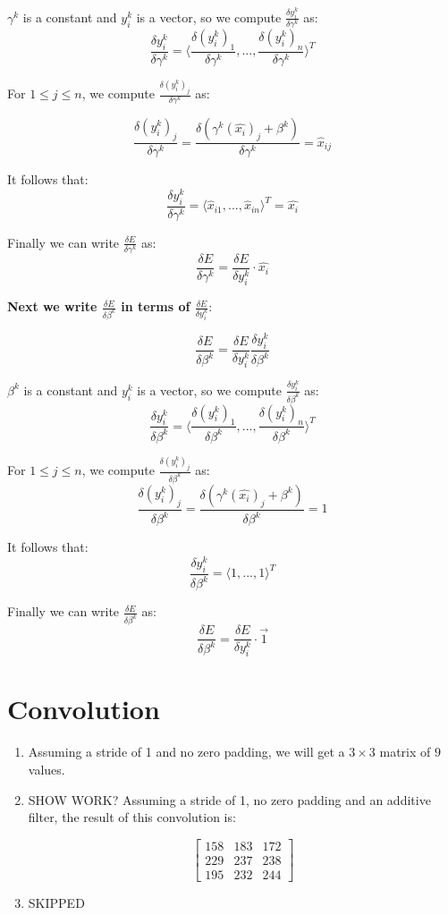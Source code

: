 \documentclass[a4paper]{article}
\begin{document}
\begin{enumerate}
{$\gamma^k$ is a constant and $y_i^k$ is a vector, so we compute $\frac{\delta y_i^k}{\delta \gamma^k}$ as:
$$ \frac{\delta y_i^k}{\delta \gamma^k} = \Big \langle \frac{\delta (y_i^k)_1}{\delta \gamma^k},...,\frac{\delta (y_i^k)_n}{\delta \gamma^k} \Big \rangle^T$$

For $1 \leq j \leq n$, we compute $\frac{\delta (y_i^k)_j}{\delta \gamma^k}$ as: 

$$\frac{\delta (y_i^k)_j}{\delta \gamma^k} =  \frac{\delta ( \gamma^k (\hat{x_i})_j + \beta^k  )} {\delta \gamma^k} = \hat{x}_{ij}$$

It follows that:
$$ \frac{\delta y_i^k}{\delta \gamma^k} = \langle \hat{x}_{i1},...,\hat{x}_{in} \rangle^T = \hat{x_i} $$

Finally we can write $\frac{\delta E}{\delta \gamma^k}$ as:
$$ \frac{\delta E}{\delta \gamma^k} = \frac{\delta E}{\delta y_i^k} \cdot  \hat{x_i}$$

\textbf{Next we write $\frac{\delta E}{\delta \beta^k}$ in terms of $\frac{\delta E}{\delta y_i^k}$}:

$$\frac{\delta E}{\delta \beta^k} = \frac{\delta E}{\delta y_i^k} \frac{\delta y_i^k}{\delta \beta^k}$$

$\beta^k$ is a constant and $y_i^k$ is a vector, so we compute $\frac{\delta y_i^k}{\delta \beta^k}$ as:
$$\frac{\delta y_i^k}{\delta \beta^k} = \Big \langle \frac{\delta (y_i^k)_1}{\delta \beta^k},...,\frac{\delta (y_i^k)_n}{\delta \beta^k} \Big \rangle^T$$

For $1 \leq j \leq n$, we compute $\frac{\delta (y_i^k)_j}{\delta \beta^k}$ as: 
$$\frac{\delta (y_i^k)_j}{\delta \beta^k} =  \frac{\delta ( \gamma^k (\hat{x_i})_j + \beta^k  )} {\delta \beta^k} = 1$$

It follows that:
$$ \frac{\delta y_i^k}{\delta \beta^k} = \langle 1, ..., 1 \rangle^T$$

Finally we can write $\frac{\delta E}{\delta \beta^k}$ as:
$$ \frac{\delta E}{\delta \beta^k} = \frac{\delta E}{\delta y_i^k} \cdot  \vec{1}$$
}


\end{enumerate}

\section{Convolution}

\begin{enumerate}
\item{Assuming a stride of 1 and no zero padding, we will get a $3 \times 3$ matrix of $9$ values.}
\item{SHOW WORK?
\newline
\newline
Assuming a stride of 1, no zero padding and an additive filter, the result of this convolution is:

$$
\begin{bmatrix}
158 & 183 & 172 \\
229 & 237 & 238 \\
195 & 232 & 244 
\end{bmatrix}
$$

 }
\item{SKIPPED}
\end{enumerate}
\end{document}
